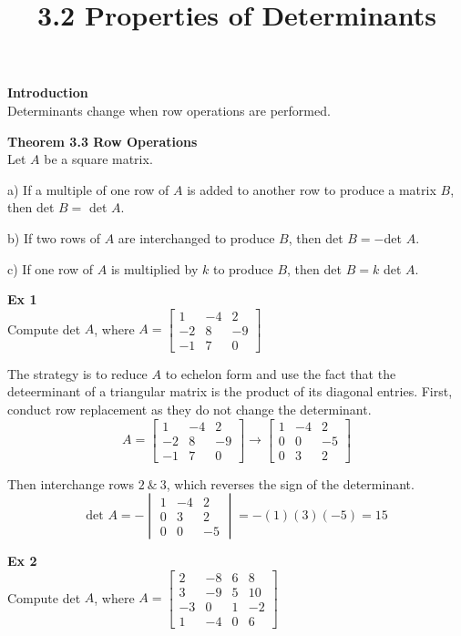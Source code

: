 \documentclass{article}
\title{3.2 Properties of Determinants}
\begin{document}
  \maketitle
  \textbf{Introduction}\\
  Determinants change when row operations are performed. 

  \textbf{Theorem 3.3 Row Operations}\\
  Let $ A $ be a square matrix.

  a) If a multiple of one row of $ A $ is added to another row to produce a matrix $ B $, then det $ B = $ det $ A $.

  b) If two rows of $ A $ are interchanged to produce $ B $, then det $ B = -$det $ A $.

  c) If one row of $ A $ is multiplied by $ k $ to produce $ B $, then det $ B=k $ det $ A $.

  \textbf{Ex 1}\\
  Compute det $ A $, where $ A=\begin{bmatrix}
    1 &-4 &2\\
    -2 &8 &-9\\
    -1 &7 &0
  \end{bmatrix} $ 

  The strategy is to reduce $ A $ to echelon form and use the fact that the deteerminant of a triangular matrix is the product of its diagonal entries. First, conduct row replacement as they do not change the determinant.
  \[
   A = \begin{bmatrix}
     1 &-4 &2\\
     -2 &8 &-9\\
     -1 &7 &0
   \end{bmatrix} \to 
   \begin{bmatrix}
     1 &-4 &2\\
     0 &0 &-5\\
     0 &3 &2
   \end{bmatrix}
  \]

  Then interchange rows $ 2 ~\&~ 3$, which reverses the sign of the determinant.
  \[
    \text{det }A=-\begin{vmatrix}
    1 &-4 &2\\
    0 &3 &2\\
    0 &0 &-5
    \end{vmatrix}=-(1)(3)(-5)=\boxed{15}
  \]
  
  \textbf{Ex 2}\\
  Compute det $ A $, where $ A = \begin{bmatrix}
    2 &-8 &6 &8\\
    3 &-9 &5 &10\\
    -3 &0 &1 &-2\\
    1 &-4 &0 &6
  \end{bmatrix}$  
\end{document}
